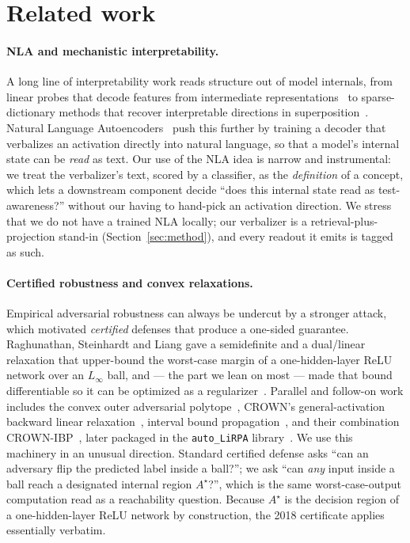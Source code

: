 \section{Related work}

\paragraph{NLA and mechanistic interpretability.}
A long line of interpretability work reads structure out of model internals, from
linear probes that decode features from intermediate
representations~\cite{alain2017probing} to sparse-dictionary methods that recover
interpretable directions in superposition~\cite{bricken2023monosemanticity,
templeton2024scaling}. Natural Language Autoencoders~\cite{nla2026} push this
further by training a decoder that verbalizes an activation directly into natural
language, so that a model's internal state can be \emph{read} as text. Our use of
the NLA idea is narrow and instrumental: we treat the verbalizer's text, scored by
a classifier, as the \emph{definition} of a concept, which lets a downstream
component decide ``does this internal state read as test-awareness?'' without our
having to hand-pick an activation direction. We stress that we do not have a trained
NLA locally; our verbalizer is a retrieval-plus-projection stand-in
(Section~\ref{sec:method}), and every readout it emits is tagged as such.

\paragraph{Certified robustness and convex relaxations.}
Empirical adversarial robustness can always be undercut by a stronger attack, which
motivated \emph{certified} defenses that produce a one-sided guarantee. Raghunathan,
Steinhardt and Liang gave a semidefinite and a dual/linear relaxation that upper-bound
the worst-case margin of a one-hidden-layer ReLU network over an $L_\infty$
ball, and --- the part we lean on most --- made that bound differentiable so it can
be optimized as a regularizer~\cite{raghunathan2018certified,raghunathan2018sdp}.
Parallel and follow-on work includes the convex outer adversarial
polytope~\cite{wong2018provable}, CROWN's general-activation backward linear
relaxation~\cite{zhang2018crown}, interval bound propagation~\cite{gowal2018ibp},
and their combination CROWN-IBP~\cite{zhang2020crownibp}, later packaged in the
\texttt{auto\_LiRPA} library~\cite{xu2020autolirpa}. We use this machinery in an
unusual direction. Standard certified defense asks ``can an adversary flip the
predicted label inside a ball?''; we ask ``can \emph{any} input inside a ball reach
a designated internal region $A^\star$?'', which is the same worst-case-output
computation read as a reachability question. Because $A^\star$ is the decision
region of a one-hidden-layer ReLU network by construction, the 2018 certificate
applies essentially verbatim.

